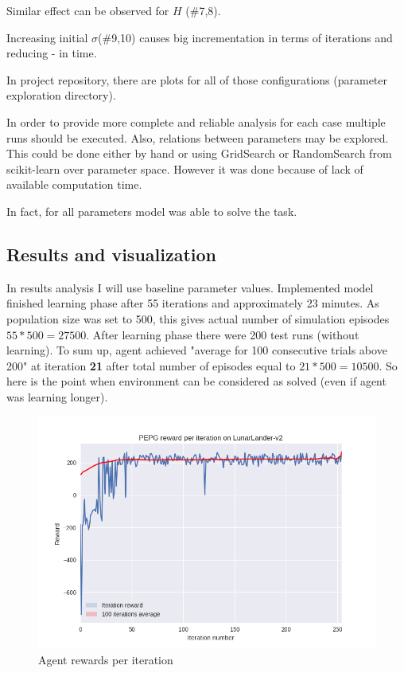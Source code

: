 \documentclass[12pt]{article}
\begin{document}
Similar effect can be observed for $H$ (\#7,8).

Increasing initial $\sigma$(\#9,10) causes big incrementation in terms of iterations and reducing - in time. 


In project repository, there are plots for all of those configurations (parameter exploration directory).


In order to provide more complete and reliable analysis for each case multiple runs should be executed. Also, relations between parameters may be explored. This could be done either by hand or using GridSearch or RandomSearch from scikit-learn\cite{sklearn} over parameter space. However it was done because of lack of available computation time.

In fact, for all parameters model was able to solve the task.

\subsection{Results and visualization}

In results analysis I will use baseline parameter values. Implemented model finished learning phase after 55 iterations and approximately 23 minutes. As population size was set to 500, this gives actual number of simulation episodes  $55 * 500 = 27500$. After learning phase there were 200 test runs (without learning). To sum up, agent achieved "average for 100 consecutive trials above 200" at iteration \textbf{21} after total number of episodes equal to $21 * 500 = 10500$. So here is the point when environment can be considered as solved (even if agent was learning longer).

\begin{figure}[!h]
\centering
\includegraphics[scale=0.9]{final_plot.png} 
\caption{Agent rewards per iteration}
\end{figure}
\end{document}
